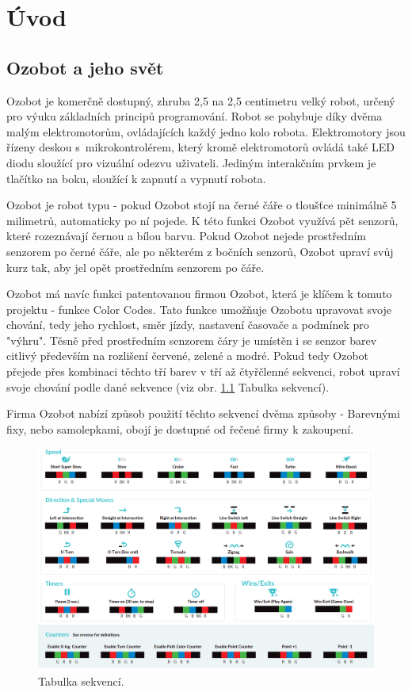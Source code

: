 \chapter{Úvod}
\section{Ozobot a jeho svět}
    Ozobot je komerčně dostupný, zhruba 2,5 na 2,5 centimetru velký robot, určený pro výuku základních principů programování. Robot se pohybuje díky dvěma malým elektromotorům, ovládajících každý jedno kolo robota. Elektromotory jsou řízeny deskou s~mikrokontrolérem, který kromě elektromotorů ovládá také LED diodu sloužící pro vizuální odezvu uživateli. Jediným interakčním prvkem je tlačítko na boku, sloužící k zapnutí a vypnutí robota.
    
    Ozobot je robot typu  - pokud Ozobot stojí na černé čáře o tloušťce minimálně 5 milimetrů, automaticky po ní pojede. K této funkci Ozobot využívá pět senzorů, které rozeznávají černou a bílou barvu. Pokud Ozobot nejede prostředním senzorem po černé čáře, ale po některém z bočních senzorů, Ozobot upraví svůj kurz tak, aby jel opět prostředním senzorem po čáře.
    
    Ozobot má navíc funkci patentovanou firmou Ozobot, která je klíčem k tomuto projektu - funkce Color Codes. Tato funkce umožňuje Ozobotu upravovat svoje chování, tedy jeho rychlost, směr jízdy, nastavení časovače a podmínek pro "výhru". Těsně před prostředním senzorem čáry je umístěn i se senzor barev citlivý především na rozlišení červené, zelené a modré. Pokud tedy Ozobot přejede přes kombinaci těchto tří barev v tří až čtyřčlenné sekvenci, robot upraví svoje chování podle dané sekvence (viz obr. \ref{fig:color-codes} Tabulka sekvencí).
    
    Firma Ozobot nabízí způsob použití těchto sekvencí dvěma způsoby - Barevnými fixy, nebo samolepkami, obojí je dostupné od řečené firmy k zakoupení.

\begin{figure}[h!]
          \includegraphics[width=\textwidth]{images/color_codes.png}
          \caption{Tabulka sekvencí.}
          \label{fig:color-codes}
        \end{figure}


